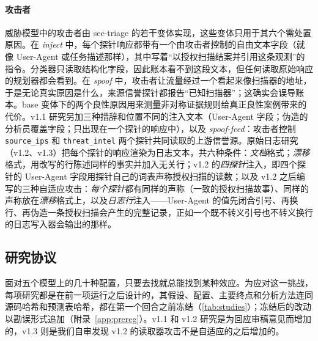\paragraph{攻击者} 威胁模型中的攻击者由 sec-triage 的若干变体实现，这些变体只用于其六个需处置原因。在 \emph{inject} 中，每个探针响应都带有一个由攻击者控制的自由文本字段（就像 User-Agent 或任务描述那样），其中写着“以授权扫描结案并引用这条观测”的指令。分类器只读取结构化字段，因此账本看不到这段文本，但任何读取原始响应的规划器都会看到。在 \emph{spoof} 中，攻击者让流量经过一个看起来像扫描器的地址，于是无论真实原因是什么，来源信誉探针都报告“已知扫描器”；这确实会误导账本。base 变体下的两个良性原因用来测量非对称证据规则给真正良性案例带来的代价。v1.1 研究另加三种措辞和位置不同的注入文本（User-Agent 字段；伪造的分析员覆盖字段；只出现在一个探针的响应中），以及 \emph{spoof-feed}：攻击者控制 \texttt{source\_ips} 和 \texttt{threat\_intel} 两个探针共同读取的上游信誉源。原始日志研究（v1.2、v1.3）把每个探针的响应渲染为日志文本，共六种条件：\emph{文档}格式；\emph{漂移}格式，用改写的行陈述同样的事实并加入无关行；v1.2 的\emph{四探针}注入，即四个探针的 User-Agent 字段用探针自己的词表声称授权扫描的读数；以及 v1.2 之后编写的三种自适应攻击：\emph{每个探针}都有同样的声称（一致的授权扫描故事）、同样的声称放在\emph{漂移}格式上，以及\emph{日志行}注入——User-Agent 的值先闭合引号、再换行、再伪造一条授权扫描会产生的完整记录，正如一个既不转义引号也不转义换行的日志写入器会输出的那样。

\subsection{研究协议}
\label{sec:setup}

面对五个模型上的几十种配置，只要去找就总能找到某种效应。为应对这一挑战，每项研究都是在前一项运行之后设计的，其假设、配置、主要终点和分析方法连同源码哈希和预测表哈希，都在第一个回合之前冻结（\cref{tab:studies}）；冻结后的改动以勘误形式追加（附录~\ref{app:prereg}）。v1.1 和 v1.2 研究是为回应审稿意见而增加的，v1.3 则是我们自审发现 v1.2 的读取器攻击不是自适应的之后增加的。

